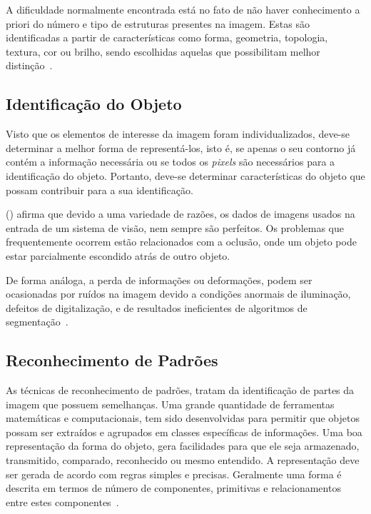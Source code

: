 A dificuldade normalmente encontrada está no fato de não haver conhecimento a priori do número e tipo de estruturas presentes na imagem. Estas são identificadas a partir de características como forma, geometria, topologia, textura, cor ou brilho, sendo escolhidas aquelas que possibilitam melhor distinção~\cite{heinen2004navegaccao}.

\subsection{Identificação do Objeto}
\label{subsec:idObjeto}

Visto que os elementos de interesse da imagem foram individualizados, deve-se determinar a melhor forma de representá-los, isto é, se apenas o seu contorno já contém a informação necessária ou se todos os \textit{pixels} são necessários para a identificação do objeto. Portanto, deve-se determinar características do objeto que possam contribuir para a sua identificação.

\citeauthor{rudek2001visao} (\citeyear{rudek2001visao}) afirma que devido a uma variedade de razões, os dados de imagens usados na entrada de um sistema de visão, nem sempre são perfeitos. Os problemas que frequentemente ocorrem estão relacionados com a oclusão, onde um objeto pode estar parcialmente escondido atrás de outro objeto. 

De forma análoga, a perda de informações ou deformações, podem ser ocasionadas por ruídos na imagem devido a condições anormais de iluminação, defeitos de digitalização, e de resultados ineficientes de algoritmos de segmentação~\cite{beis1999indexing}.

\subsection{Reconhecimento de Padrões}
\label{subsec:recPadroes}

As técnicas de reconhecimento de padrões, tratam da identificação de partes da imagem que possuem semelhanças. Uma grande quantidade de ferramentas matemáticas e computacionais, tem sido desenvolvidas para permitir que objetos possam ser extraídos e agrupados em classes específicas de informações. Uma boa representação da forma do objeto, gera facilidades para que ele seja armazenado, transmitido, comparado, reconhecido ou mesmo entendido. A representação deve ser gerada de acordo com regras simples e precisas. Geralmente uma forma é descrita em termos de número de componentes, primitivas e relacionamentos entre estes componentes~\cite{rudek2001visao}.

